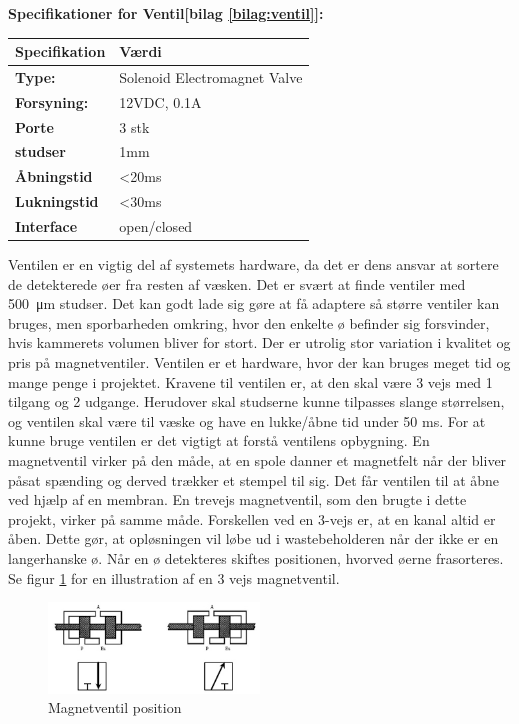 \textbf{Specifikationer for Ventil[bilag \ref{bilag:ventil}]:} 
\begin{center}
		\begin{longtable}{ | m{6.5cm} | m{6.5cm}| } 
			\hline
			\textbf{Specifikation} &\textbf{Værdi} \\ 
			\hline
			\textbf{Type:} & Solenoid Electromagnet Valve \\ 
			\hline
			\textbf{Forsyning:} & 12VDC, 0.1A  \\ 
			\hline
			\textbf{Porte} & 3 stk \\ 
			\hline		
			\textbf{studser} & 1mm  \\ 
			\hline	
			\textbf{Åbningstid} & <20ms  \\ 
			\hline	
			\textbf{Lukningstid} & <30ms  \\ 
			\hline	
			\textbf{Interface} & open/closed  \\ 
			\hline	
		\end{longtable}
\end{center}
Ventilen er en vigtig del af systemets hardware, da det er dens ansvar at sortere de detekterede øer fra resten af væsken. Det er svært at finde ventiler med \SI{500}{\micro\metre} studser. Det kan godt lade sig gøre at få adaptere så større ventiler kan bruges, men sporbarheden omkring, hvor den enkelte ø befinder sig forsvinder, hvis kammerets volumen bliver for stort. Der er utrolig stor variation i kvalitet og pris på magnetventiler. Ventilen er et hardware, hvor der kan bruges meget tid og mange penge i projektet.
Kravene til ventilen er, at den skal være 3 vejs med 1 tilgang og 2 udgange. Herudover skal studserne kunne tilpasses slange størrelsen, og ventilen skal være til væske og have en lukke/åbne tid under 50 ms.
For at kunne bruge ventilen er det vigtigt at forstå ventilens opbygning. 
 En magnetventil virker på den måde, at en spole danner et magnetfelt når der bliver påsat spænding og derved trækker et stempel til sig. Det får ventilen til at åbne ved hjælp af en membran. En trevejs magnetventil, som den brugte i dette projekt, virker på samme måde. Forskellen ved en 3-vejs er, at en kanal altid er åben. Dette gør, at opløsningen vil løbe ud i wastebeholderen når der ikke er en langerhanske ø. Når en ø detekteres skiftes positionen, hvorved øerne frasorteres. Se figur \ref{fig:ventilpos} for en illustration af en 3 vejs magnetventil.

\begin{figure}[H]
	\centering
	\includegraphics[width=0.5\textwidth]{billeder/Hardware/ventil.png}
	\caption{Magnetventil position}
	\label{fig:ventilpos}
\end{figure}  

